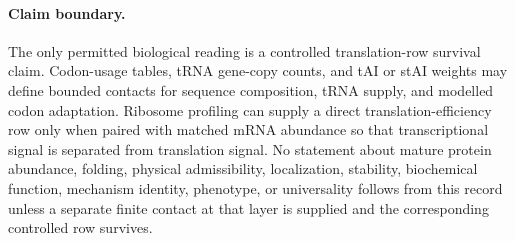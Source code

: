 \paragraph{Claim boundary.}
The only permitted biological reading is a controlled translation-row survival claim.  Codon-usage tables, tRNA gene-copy counts, and tAI or stAI weights may define bounded contacts for sequence composition, tRNA supply, and modelled codon adaptation.  Ribosome profiling can supply a direct translation-efficiency row only when paired with matched mRNA abundance so that transcriptional signal is separated from translation signal.  No statement about mature protein abundance, folding, physical admissibility, localization, stability, biochemical function, mechanism identity, phenotype, or universality follows from this record unless a separate finite contact at that layer is supplied and the corresponding controlled row survives.
